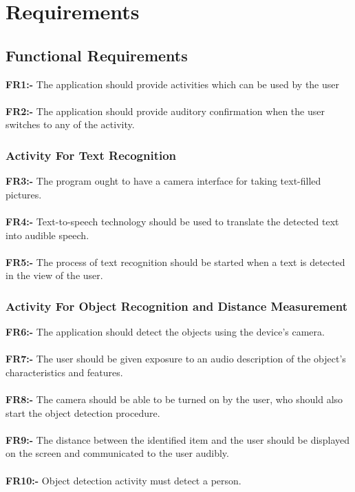 \documentclass[MScCS]{uccthesis}
\begin{document}
\section{Requirements}
\subsection{Functional Requirements}


\textbf{FR1:-}  The application should provide activities which can be used by the user
\\
\\\textbf{FR2:-}  The application should provide auditory confirmation when the user switches to any of the activity.
\\
\subsubsection{Activity For Text Recognition}

\textbf{FR3:-} The program ought to have a camera interface for taking text-filled pictures.
\\
\\\textbf{FR4:-} Text-to-speech technology should be used to translate the detected text into audible speech.
\\
\\\textbf{FR5:-} The process of text recognition should be started when a text is detected in the view of the user.
\\
\subsubsection{Activity For Object Recognition and Distance Measurement}

\textbf{FR6:-} The application should detect the objects using the device's camera.
\\
\\\textbf{FR7:-} The user should be given exposure to an audio description of the object's characteristics and features.
\\
\\\textbf{FR8:-} The camera should be able to be turned on by the user, who should also start the object detection procedure.
\\
\\\textbf{FR9:-} The distance between the identified item and the user should be displayed on the screen and communicated to the user audibly.
\\
\\\textbf{FR10:-} Object detection activity must detect a person.
\end{document}

